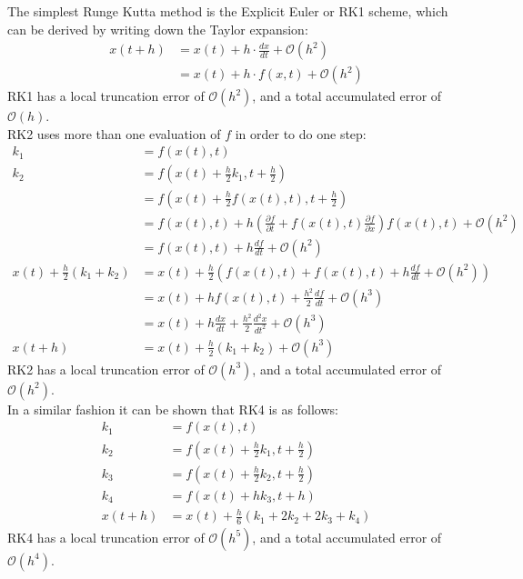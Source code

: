The simplest Runge Kutta method is the Explicit Euler or RK1 scheme, which can be derived by writing down the Taylor expansion:
\begin{align*}
x(t+h) &= x(t) + h \cdot \frac{dx}{dt} + \mathcal{O}(h ^2)\\
&= x(t) + h \cdot f(x,t) + \mathcal{O}(h ^2)
\end{align*}
RK1 has a local truncation error of $\mathcal{O}(h^2)$, and a total accumulated error of $\mathcal{O}(h)$.\\
RK2 uses more than one evaluation of $f$ in order to do one step:
\begin{align*}
k_1 &= f(x(t),t)\\
k_2 &= f(x(t) + \frac{h}{2} k_1, t + \frac{h}{2})\\
&= f(x(t) + \frac{h}{2} f(x(t),t), t + \frac{h}{2})\\
&= f(x(t),t) + h\left(\frac{\partial f}{\partial t} + f(x(t),t)\frac{\partial f}{\partial x}\right)f(x(t),t) + \mathcal{O}(h^2)\\
&= f(x(t),t) + h\frac{df}{dt} + \mathcal{O}(h^2)\\
x(t) + \frac{h}{2} (k_1+k_2) &= x(t) + \frac{h}{2} \left(f(x(t),t) + f(x(t),t) + h\frac{df}{dt} + \mathcal{O}(h^2)\right)\\
&= x(t) + h f(x(t),t) + \frac{h^2}{2} \frac{df}{dt} + \mathcal{O}(h^3)\\
&= x(t) + h \frac{dx}{dt} + \frac{h^2}{2} \frac{d^2x}{dt^2} + \mathcal{O}(h^3)\\
x(t+h) &= x(t) + \frac{h}{2} (k_1+k_2) + \mathcal{O}(h^3)
\end{align*}
RK2 has a local truncation error of $\mathcal{O}(h^3)$, and a total accumulated error of $\mathcal{O}(h^2)$.\\
In a similar fashion it can be shown that RK4 is as follows:
\begin{align*}
k_1 &= f(x(t),t)\\
k_2 &= f\left(x(t)+\frac{h}{2}k_1,t+\frac{h}{2}\right)\\
k_3 &= f\left(x(t)+\frac{h}{2}k_2,t+\frac{h}{2}\right)\\
k_4 &= f(x(t) + h k_3, t + h)\\
x(t+h) &= x(t) + \frac{h}{6}(k_1+2k_2+2k_3+k_4)
\end{align*}
RK4 has a local truncation error of $\mathcal{O}(h^5)$, and a total accumulated error of $\mathcal{O}(h^4)$.\\

